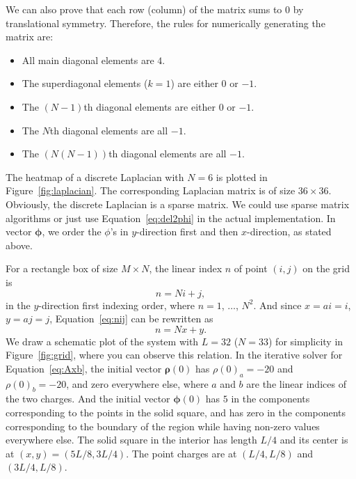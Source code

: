 We can also prove that each row (column) of the matrix sums to \(0\) by
translational symmetry. Therefore, the rules for numerically generating
the matrix are\footnotemark{}:
%
\begin{itemize}
    \item All main diagonal elements are \(4\).
    \item The superdiagonal elements (\(k = 1\)) are either \(0\) or \(-1\).
    \item The \((N-1)\)th diagonal elements are either \(0\) or \(-1\).
    \item The \(N\)th diagonal elements are all \(-1\).
    \item The \((N(N - 1))\)th diagonal elements are all \(-1\).
\end{itemize}
%

The heatmap of a discrete Laplacian with \(N = 6\) is plotted in Figure~\ref{fig:laplacian}.
The corresponding Laplacian matrix is of size \(36 \times 36\).
Obviously, the discrete Laplacian is a sparse matrix.
We could use sparse matrix algorithms or just use Equation~\eqref{eq:del2phi} in the actual
implementation.
In vector \(\bm{\phi}\), we order the \(\phi\)'s in \(y\)-direction first and then
\(x\)-direction, as stated above.

For a rectangle box of size \(M \times N\), the linear index \(n\) of point \((i, j)\)
on the grid is
%
\begin{equation}\label{eq:nij}
    n = N i + j,
\end{equation}
%
in the \(y\)-direction first indexing order, where \(n = 1\), \(\ldots\), \(N^2\).
And since \(x = a i = i\), \(y = a j = j\), Equation~\eqref{eq:nij} can be rewritten as
%
\begin{equation}
    n = N x + y.
\end{equation}
%
We draw a schematic plot of the system with \(L = 32\) (\(N = 33\)) for simplicity in
Figure~\ref{fig:grid}, where you can observe this relation.
In the iterative solver for Equation~\eqref{eq:Axb},
the initial vector \(\bm{\rho}(0)\) has \(\rho(0)_a = -20\) and \(\rho(0)_b = -20\),
and zero everywhere else,
where \(a\) and \(b\) are the linear indices of the two charges.
And the initial vector \(\bm{\phi}(0)\) has \(5\) in the components corresponding to
the points in the solid square, and has zero in the components corresponding to
the boundary of the region while having non-zero values everywhere else.
The solid square in the interior has length \(L/4\) and
its center is at \((x, y) = (5L/8, 3L/4)\).
The point charges are at \((L/4, L/8)\) and \((3L/4, L/8)\).

